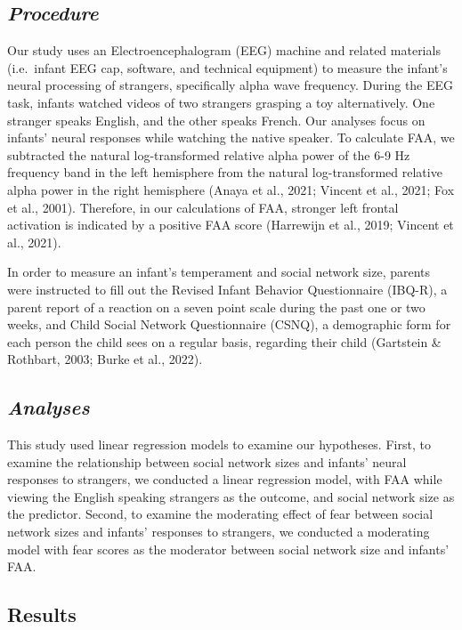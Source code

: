 \documentclass[
  man,
  floatsintext,
  longtable,
  nolmodern,
  notxfonts,
  notimes,
  colorlinks=true,linkcolor=blue,citecolor=blue,urlcolor=blue]{apa7}
\begin{document}
\subsection{\texorpdfstring{\emph{Procedure}}{Procedure}}\label{procedure}

Our study uses an Electroencephalogram (EEG) machine and related
materials (i.e.~infant EEG cap, software, and technical equipment) to
measure the infant's neural processing of strangers, specifically alpha
wave frequency. During the EEG task, infants watched videos of two
strangers grasping a toy alternatively. One stranger speaks English, and
the other speaks French. Our analyses focus on infants' neural responses
while watching the native speaker. To calculate FAA, we subtracted the
natural log-transformed relative alpha power of the 6-9 Hz frequency
band in the left hemisphere from the natural log-transformed relative
alpha power in the right hemisphere (Anaya et al., 2021; Vincent et al.,
2021; Fox et al., 2001). Therefore, in our calculations of FAA, stronger
left frontal activation is indicated by a positive FAA score (Harrewijn
et al., 2019; Vincent et al., 2021).

In order to measure an infant's temperament and social network size,
parents were instructed to fill out the Revised Infant Behavior
Questionnaire (IBQ-R), a parent report of a reaction on a seven point
scale during the past one or two weeks, and Child Social Network
Questionnaire (CSNQ), a demographic form for each person the child sees
on a regular basis, regarding their child (Gartstein \& Rothbart, 2003;
Burke et al., 2022).

\subsection{\texorpdfstring{\emph{Analyses}}{Analyses}}\label{analyses}

This study used linear regression models to examine our hypotheses.
First, to examine the relationship between social network sizes and
infants' neural responses to strangers, we conducted a linear regression
model, with FAA while viewing the English speaking strangers as the
outcome, and social network size as the predictor. Second, to examine
the moderating effect of fear between social network sizes and infants'
responses to strangers, we conducted a moderating model with fear scores
as the moderator between social network size and infants' FAA.

\subsection{Results}\label{results}
\end{document}
